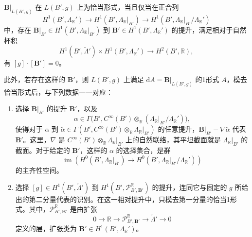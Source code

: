\begin{theorem}\label{thm:6.71}
$\mathbf B|_{L(B',g)}$ 在 $L(B',g)$ 上为恰当形式，当且仅当在正合列
\[
H^1(B',\Lambda_{\mathbb R}')\longrightarrow H^1(B',\Lambda_{\mathbb R}|_{B'})
\longrightarrow H^1(B',\Lambda_{\mathbb R}|_{B'}/\Lambda_{\mathbb R}')
\]
中，存在 $\mathbf B|_{B'}\in H^1(B',\Lambda_{\mathbb R}|_{B'})$ 到 $\mathbf B'\in H^1(B',\Lambda_{\mathbb R}')$ 的提升，满足相对于自然杯积
\[
H^1(B',\check\Lambda')\times H^1(B',\Lambda_{\mathbb R}')
\longrightarrow H^2(B',\mathbb R),
\]
有 $[g]\cdot[\mathbf B']=0$。

此外，若存在这样的 $\mathbf B'$，则 $L(B',g)$ 上满足 $\mathrm dA=\mathbf B|_{L(B',g)}$ 的1形式 $A$，模去恰当形式后，与下列数据一一对应：
\begin{enumerate}[label=(\arabic*)]
\item 选择 $\mathbf B|_{B'}$ 的提升 $\mathbf B'$，以及
\[
\alpha\in\Gamma\bigl(B',C^\infty(B')\otimes_{\mathbb R}
(\Lambda_{\mathbb R}|_{B'}/\Lambda_{\mathbb R}')\bigr),
\]
使得对于 $\alpha$ 到 $\widetilde\alpha\in\Gamma(B',C^\infty(B')\otimes_{\mathbb R}\Lambda_{\mathbb R}|_{B'})$ 的任意提升，$\mathbf B|_{B'}-\nabla\widetilde\alpha$ 代表 $\mathbf B'$。这里，$\nabla$ 是 $C^\infty(B')\otimes_{\mathbb R}\Lambda_{\mathbb R}|_{B'}$ 上的自然联络，其平坦截面就是 $\Lambda_{\mathbb R}|_{B'}$ 的截面。对于给定的 $\mathbf B'$，这样的 $\alpha$ 的选择集合，是群
\[
\operatorname{im}\!\left(H^0(B',\Lambda_{\mathbb R}|_{B'})
\longrightarrow H^0(B',\Lambda_{\mathbb R}|_{B'}/\Lambda_{\mathbb R}')\right)
\]
的主齐性空间。
\item 选择 $[g]\in H^1(B',\check\Lambda')$ 到 $H^1(B',\mathcal P^{\mathbb R}_{B',\mathbf B'})$ 的提升，连同它与固定的 $g$ 所给出的第二分量代表的识别。在这一相对提升中，只模去第一分量的恰当1形式。其中，$\mathcal P^{\mathbb R}_{B',\mathbf B'}$ 是由扩张
\[
0\longrightarrow\mathbb R\longrightarrow\mathcal P^{\mathbb R}_{B',\mathbf B'}
\longrightarrow\check\Lambda'\longrightarrow0
\]
定义的层，扩张类为 $\mathbf B'\in H^1(B',\Lambda_{\mathbb R}')$。
\end{enumerate}
\end{theorem}

